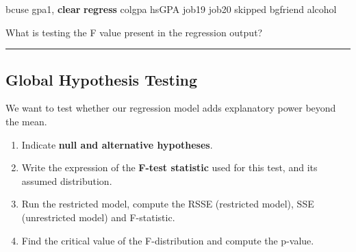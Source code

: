 \documentclass[
  letterpaper,
  DIV=11,
  numbers=noendperiod]{scrartcl}
\newenvironment{Shaded}{\begin{snugshade}}{\end{snugshade}}
\newcommand{\KeywordTok}[1]{\textcolor[rgb]{0.00,0.23,0.31}{\textbf{#1}}}
\newcommand{\NormalTok}[1]{\textcolor[rgb]{0.00,0.23,0.31}{#1}}
\providecommand{\tightlist}{%
  \setlength{\itemsep}{0pt}\setlength{\parskip}{0pt}}
\begin{document}
\begin{Shaded}
\begin{Highlighting}[]
\NormalTok{bcuse gpa1, }\KeywordTok{clear}
\KeywordTok{regress}\NormalTok{ colgpa hsGPA job19 job20 skipped bgfriend alcohol}
\end{Highlighting}
\end{Shaded}

\begin{tcolorbox}[enhanced jigsaw, rightrule=.15mm, leftrule=.75mm, colback=white, left=2mm, colframe=quarto-callout-caution-color-frame, coltitle=black, opacitybacktitle=0.6, bottomrule=.15mm, toprule=.15mm, colbacktitle=quarto-callout-caution-color!10!white, breakable, titlerule=0mm, opacityback=0, toptitle=1mm, bottomtitle=1mm, title={Global Hypothesis Testing}, arc=.35mm]

What is testing the F value present in the regression output?

\end{tcolorbox}

\begin{center}\rule{0.5\linewidth}{0.5pt}\end{center}

\subsection{Global Hypothesis Testing}\label{global-hypothesis-testing}

We want to test whether our regression model adds explanatory power
beyond the mean.

\begin{tcolorbox}[enhanced jigsaw, rightrule=.15mm, leftrule=.75mm, colback=white, left=2mm, colframe=quarto-callout-warning-color-frame, coltitle=black, opacitybacktitle=0.6, bottomrule=.15mm, toprule=.15mm, colbacktitle=quarto-callout-warning-color!10!white, breakable, titlerule=0mm, opacityback=0, toptitle=1mm, bottomtitle=1mm, title={Exercise}, arc=.35mm]

\begin{enumerate}
\def\labelenumi{\arabic{enumi}.}
\tightlist
\item
  Indicate \textbf{null and alternative hypotheses}.
\item
  Write the expression of the \textbf{F-test statistic} used for this
  test, and its assumed distribution.
\item
  Run the restricted model, compute the RSSE (restricted model), SSE
  (unrestricted model) and F-statistic.
\item
  Find the critical value of the F-distribution and compute the p-value.
\end{enumerate}

\end{tcolorbox}
\end{document}
